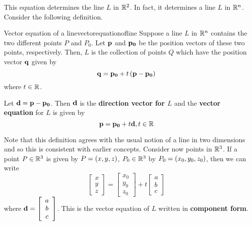 This equation determines the line $L$ in $\mathbb{R}^2$. In fact, it determines a line $L$ in $\mathbb{R}^n$. Consider the following definition.

\begin{definition}{Vector equation of a line}{vectorequationofline}
Suppose a line $L$ in $\mathbb{R}^{n}$ contains the two different points $P$ and 
$P_0$. Let ${\bf p}$ and ${\bf p_0}$ be the position vectors of these two points, respectively.
Then, $L$ is the collection of points $Q$ which have the position vector ${\bf q}$ given by
\begin{equation*}
{\bf q}={\bf p_0}+t\left({\bf p}-{\bf p_0}\right)
\end{equation*}
where $t\in \mathbb{R}$. 

Let ${\bf d} = {\bf p} - {\bf p_0}$. Then ${\bf d}$ is the \textbf{direction vector for $L$} and the \textbf{vector equation} for $L$ is given by 
\begin{equation*}
{\bf p}={\bf p_0}+t{\bf d}, t\in\mathbb{R}
\end{equation*}
\end{definition}

Note that this definition agrees with the usual notion of a
line in two dimensions and so this is consistent with earlier concepts. Consider now points in $\mathbb{R}^3$. If a point $P \in \mathbb{R}^3$ is given by $P = \left(x,y,z \right)$, $P_0 \in \mathbb{R}^3$ by $P_0 = \left(x_0, y_0, z_0 \right)$, then we can write
\begin{equation*}
\left[
\begin{array}{c}
x \\
y \\
z 
\end{array}
\right] = 
\left[
\begin{array}{c}
x_0 \\
y_0 \\
z_0 
\end{array}
\right]
+
t
\left[
\begin{array}{c}
a \\
b \\
c 
\end{array}
\right]
\end{equation*}
where ${\bf d} = \left[
\begin{array}{c}
a \\
b \\
c 
\end{array}
\right]$. This is the vector equation of $L$ written in \textbf{component form}.

